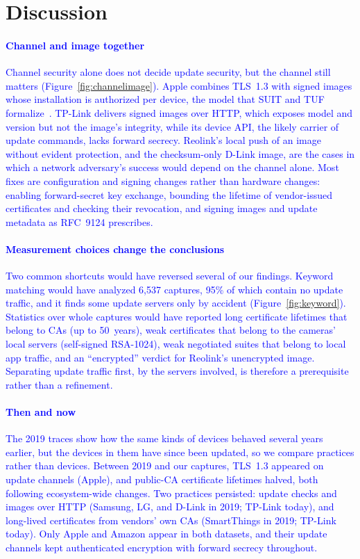 \section{Discussion}
\label{sec:discussion}

\paragraph{\textcolor{blue}{Channel and image together}}
\textcolor{blue}{Channel security alone does not decide update security, but the channel still matters (Figure~\ref{fig:channelimage}).
Apple combines TLS~1.3 with signed images whose installation is authorized per device, the model that SUIT and TUF formalize~\cite{rfc9124,samuel2010tuf}.
TP-Link delivers signed images over HTTP, which exposes model and version but not the image's integrity, while its device API, the likely carrier of update commands, lacks forward secrecy.
Reolink's local push of an image without evident protection, and the checksum-only D-Link image, are the cases in which a network adversary's success would depend on the channel alone.
Most fixes are configuration and signing changes rather than hardware changes: enabling forward-secret key exchange, bounding the lifetime of vendor-issued certificates and checking their revocation, and signing images and update metadata as RFC~9124 prescribes.}

\paragraph{\textcolor{blue}{Measurement choices change the conclusions}}
\textcolor{blue}{Two common shortcuts would have reversed several of our findings.
Keyword matching would have analyzed 6,537 captures, 95\% of which contain no update traffic, and it finds some update servers only by accident (Figure~\ref{fig:keyword}).
Statistics over whole captures would have reported long certificate lifetimes that belong to CAs (up to 50~years), weak certificates that belong to the cameras' local servers (self-signed RSA-1024), weak negotiated suites that belong to local app traffic, and an ``encrypted'' verdict for Reolink's unencrypted image.
Separating update traffic first, by the servers involved, is therefore a prerequisite rather than a refinement.}

\paragraph{\textcolor{blue}{Then and now}}
\textcolor{blue}{The 2019 traces show how the same kinds of devices behaved several years earlier, but the devices in them have since been updated, so we compare practices rather than devices.
Between 2019 and our captures, TLS~1.3 appeared on update channels (Apple), and public-CA certificate lifetimes halved, both following ecosystem-wide changes.
Two practices persisted: update checks and images over HTTP (Samsung, LG, and D-Link in 2019; TP-Link today), and long-lived certificates from vendors' own CAs (SmartThings in 2019; TP-Link today).
Only Apple and Amazon appear in both datasets, and their update channels kept authenticated encryption with forward secrecy throughout.}

